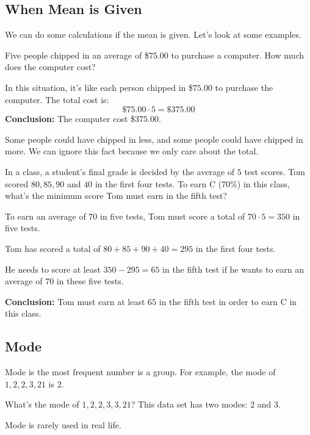 \subsection{When Mean is Given}
We can do some calculations if the mean is given. Let's look at some examples.

\begin{myexample}
Five people chipped in an average of \$$75.00$ to purchase a computer. How much does the computer cost?
\end{myexample}
\begin{solution}
In this situation, it's like each person chipped in \$$75.00$ to purchase the computer. The total cost is:
\[ \$75.00 \cdot 5 = \$375.00 \]
\textbf{Conclusion:} The computer cost \$$375.00$.

Some people could have chipped in less, and some people could have chipped in more. We can ignore this fact because we only care about the total.
\end{solution}

\begin{myexample}
In a class, a student's final grade is decided by the average of $5$ test scores. Tom scored $80, 85, 90$ and $40$ in the first four tests. To earn C ($70\%$) in this class, what's the minimum score Tom must earn in the fifth test?
\end{myexample}
\begin{solution}
To earn an average of $70$ in five tests, Tom must score a total of $70\cdot5=350$ in five tests.

Tom has scored a total of $80+85+90+40=295$ in the first four tests.

He needs to score at least $350-295=65$ in the fifth test if he wants to earn an average of $70$ in these five tests.

\textbf{Conclusion:} Tom must earn at least $65$ in the fifth test in order to earn C in this class.

\end{solution}

\subsection{Mode}
Mode is the most frequent number is a group. For example, the mode of $1,2,2,3,21$ is $2$.

What's the mode of $1,2,2,3,3,21$? This data set has two modes: $2$ and $3$.

Mode is rarely used in real life.

